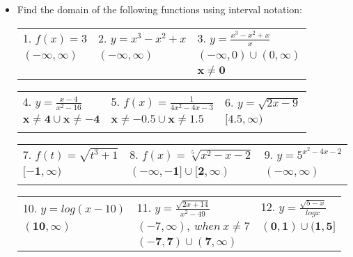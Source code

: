 \documentclass[a4paper]{article}
\begin{document}
   \begin{itemize} \itemsep 3em

   \item Find the domain of the following functions using interval notation: \\
   
   \begin{tabular}{ p{5cm} p{5cm} p{5cm} }
      1. $ f(x) = 3                        $&
      2. $ y = x^3 - x^2 + x               $&
      3. $ y = \frac{ x^3 - x^2 + x }{ x } $
   \\ 
      $ \bm{ (-\infty ,  \infty) }         $&
      $ \bm{ (-\infty, \infty) }           $&
      $ (-\infty, 0) \cup (0, \infty)      $
   \\
      & %
      & %
      $ \bm{ x \neq 0 } $
   \end{tabular}

   \begin{tabular}{ p{5cm} p{5cm} p{5cm} }
      4. $ y = \frac{ x-4 }{ x^2-16 }      $&
      5. $ f(x) = \frac{ 1 }{ 4x^2-4x-3 }  $&
      6. $ y = \sqrt{ 2x-9 }               $
   \\
      $ \bm{ x \neq 4 \cup x \neq -4 }     $&
      $ \bm{ x \neq -0.5 \cup x \neq 1.5 } $&
      $ \bm{ [4.5, \infty) }               $
   \\ \\ %
   \end{tabular}

   \begin{tabular}{ p{5cm} p{5cm} p{5cm} }
      7. $ f(t) = \sqrt{ t^3 + 1 }         $&
      8. $ f(x) = \sqrt[5]{ x^2 - x - 2 }  $&
      9. $ y = 5^{ x^2 - 4x - 2 }          $
   \\
      $ \bm{ [-1, \infty) }                $&
      $ \bm{ (-\infty,-1] \cup [2,\infty) }$&
      $ \bm{ (-\infty, \infty) }           $
   \\ \\ %
   \end{tabular}

   \begin{tabular}{ p{5cm} p{5cm} p{5cm} }
      10. $ y = log(x-10)                          $&
      11. $ y = \frac{ \sqrt{2x+14} }{ x^2-49 }    $&
      12. $ y = \frac{ \sqrt{5-x} }{ log x }       $
   \\
      $ \bm{ (10, \infty) }                        $&
      $ (-7, \infty), \: when \:x \neq 7           $&
      $ \bm{ (0, 1) \cup (1, 5] }                  $
   \\
      & %
      $ \bm{ (-7, 7) \cup (7, \infty) }            $
   \end{tabular}
   \\ \\ %


\end{itemize}
\end{document}
